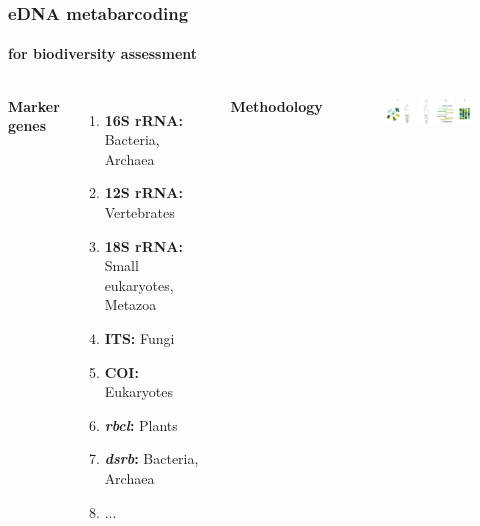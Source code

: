 \documentclass{beamer}
\begin{document}
   \begin{darkframes}


   \begin{frame}
      
      \frametitle{eDNA metabarcoding}
      \framesubtitle{for biodiversity assessment}
      \begin{singlespace}


         \begin{columns}[onlytextwidth]


               \textbf{Marker genes} \\ 

               \begin{enumerate}
                  \item \textbf{16S rRNA:} Bacteria, Archaea
                  \item \textbf{12S rRNA:} Vertebrates
                  \item \textbf{18S rRNA:} Small eukaryotes, Metazoa
                  \item \textbf{ITS:} Fungi
                  \item \textbf{COI:} Eukaryotes
                  \item \textbf{\textit{rbcl}:} Plants
                  \item \textbf{\textit{dsrb}:} Bacteria, Archaea
                  \item ...
               \end{enumerate}


               \textbf{Methodology}

               \begin{figure}
                  \includegraphics[width=55mm]{resources/metabarcoding-steps.png}
               \end{figure}


\end{columns}
\end{singlespace}
\end{frame}
\end{darkframes}
\end{document}
